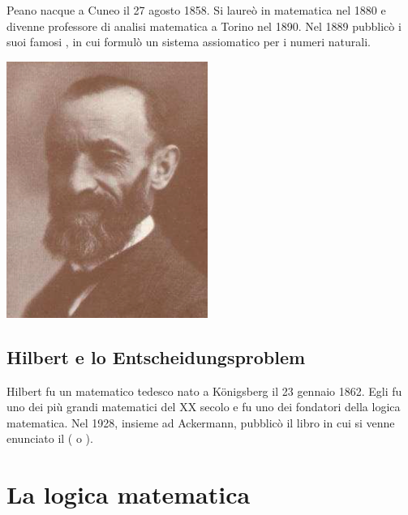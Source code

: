 Peano nacque a Cuneo il 27 agosto 1858. Si laureò in matematica nel 1880 e divenne professore di analisi matematica a Torino nel 1890. Nel 1889 pubblicò i suoi famosi , in cui formulò un sistema assiomatico per i numeri naturali.

\begin{center}
    \includegraphics[scale = 0.7]{images/Peano.png}
\end{center}


\subsection{Hilbert e lo Entscheidungsproblem}

Hilbert fu un matematico tedesco nato a Königsberg il 23 gennaio 1862. Egli fu uno dei più grandi matematici del XX secolo e fu uno dei fondatori della logica matematica.
Nel 1928, insieme ad Ackermann, pubblicò il libro  in cui si venne enunciato il  (
    o ).


\pagebreak

\section{La logica matematica}

